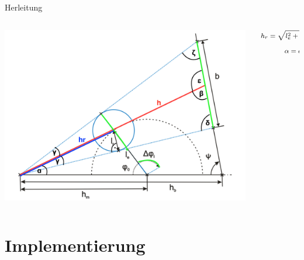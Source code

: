\documentclass[compress]{beamer}
\begin{document}
\begin{frame}{Herleitung}
	\begin{columns}
		\begin{column}{0.55\linewidth}
			\includegraphics[width=\linewidth]{images/edited.png}
		\end{column}
		\begin{column}{0.43\linewidth}
			$$ \mbox{ \footnotesize $ \begin{align}
				h_r = \sqrt{l_e^2 + h_m^2 - 2l_eh_m\cdot cos(\phi)}\\
				\alpha =arcsin\left(l_e \cdot \frac{sin(\phi)}{h_r}\right)\\
				\beta = \pi - \alpha - \psi\\
				h = sin(\phi) \cdot \frac{h_b}{sin(\beta)}\\
				\gamma = arcsin(\frac{l_r}{h_r})\\
				\delta = \pi - \beta - \gamma\\
				b_{bottom} = \frac{sin(\gamma)}{sin(\delta)}\cdot h\\
				\epsilon = \pi - \beta\\
				\zeta = \pi - \epsilon - \gamma\\
				b_{top} = \frac{sin(\gamma)}{sin(\zeta)}\cdot h\\
				b = b_{top} + b_{bottom}
				\end{align} $} $$
		\end{column}
	\end{columns}
\end{frame}

\section{Implementierung}
\end{document}
